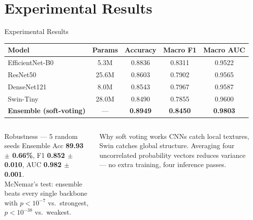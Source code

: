 \documentclass[10pt, aspectratio=169]{beamer}
\renewcommand{\framesubtitle}[1]{%
  \vspace*{-0.3em}\noindent{\large\bfseries\textcolor{usthdark}{#1}}\par\vspace{0.6em}%
}
\begin{document}
\section{Experimental Results}
\begin{frame}{Experimental Results}
    \framesubtitle{Single Models and the Ensemble}
    \scriptsize
    \begin{table}[]
        \centering
        \begin{tabular}{lcccc}
        \toprule
        \rowcolor{usthblue!25}
        \textbf{Model} & \textbf{Params} & \textbf{Accuracy} & \textbf{Macro F1} & \textbf{Macro AUC} \\
        \midrule
        EfficientNet-B0 & 5.3M  & 0.8836 & 0.8311 & 0.9522 \\
        ResNet50        & 25.6M & 0.8603 & 0.7902 & 0.9565 \\
        DenseNet121     & 8.0M  & 0.8543 & 0.7967 & 0.9587 \\
        Swin-Tiny       & 28.0M & 0.8490 & 0.7855 & 0.9600 \\
        \rowcolor{usthlight} \textbf{Ensemble (soft-voting)} & --- & \textbf{0.8949} & \textbf{0.8450} & \textbf{0.9803} \\
        \bottomrule
        \end{tabular}
    \end{table}

    \vspace{0.3cm}
    \begin{columns}[T]
        \begin{block}{Robustness --- 5 random seeds}
            \footnotesize
            Ensemble Acc \textbf{89.93 $\pm$ 0.66\%}, F1 \textbf{0.852 $\pm$ 0.010}, AUC \textbf{0.982 $\pm$ 0.001}. \\[2pt]
            McNemar's test: ensemble beats every single backbone with $p < 10^{-7}$ vs.\ strongest, $p < 10^{-38}$ vs.\ weakest.
        \end{block}

        \begin{block}{Why soft voting works}
            \footnotesize
            CNNs catch local textures, Swin catches global structure. Averaging four uncorrelated probability vectors reduces variance --- no extra training, four inference passes.
        \end{block}
    \end{columns}
\end{frame}
\end{document}
